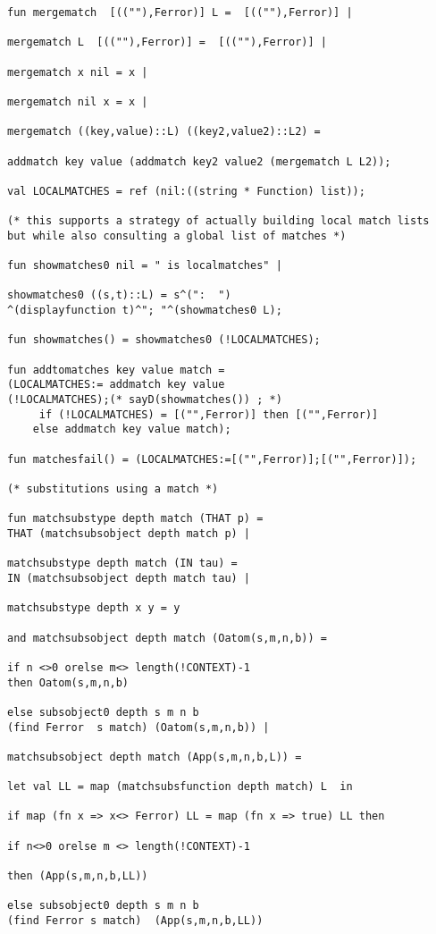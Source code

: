 \documentclass[12pt]{article}
\begin{document}
\begin{verbatim}
fun mergematch  [((""),Ferror)] L =  [((""),Ferror)] |

mergematch L  [((""),Ferror)] =  [((""),Ferror)] |

mergematch x nil = x |

mergematch nil x = x |

mergematch ((key,value)::L) ((key2,value2)::L2) =

addmatch key value (addmatch key2 value2 (mergematch L L2));

val LOCALMATCHES = ref (nil:((string * Function) list));

(* this supports a strategy of actually building local match lists
but while also consulting a global list of matches *)

fun showmatches0 nil = " is localmatches" |

showmatches0 ((s,t)::L) = s^(":  ")
^(displayfunction t)^"; "^(showmatches0 L);

fun showmatches() = showmatches0 (!LOCALMATCHES);

fun addtomatches key value match = 
(LOCALMATCHES:= addmatch key value 
(!LOCALMATCHES);(* sayD(showmatches()) ; *)
     if (!LOCALMATCHES) = [("",Ferror)] then [("",Ferror)]
    else addmatch key value match);

fun matchesfail() = (LOCALMATCHES:=[("",Ferror)];[("",Ferror)]);

(* substitutions using a match *)

fun matchsubstype depth match (THAT p) = 
THAT (matchsubsobject depth match p) |

matchsubstype depth match (IN tau) = 
IN (matchsubsobject depth match tau) |

matchsubstype depth x y = y

and matchsubsobject depth match (Oatom(s,m,n,b)) =

if n <>0 orelse m<> length(!CONTEXT)-1 
then Oatom(s,m,n,b)

else subsobject0 depth s m n b 
(find Ferror  s match) (Oatom(s,m,n,b)) |

matchsubsobject depth match (App(s,m,n,b,L)) =

let val LL = map (matchsubsfunction depth match) L  in

if map (fn x => x<> Ferror) LL = map (fn x => true) LL then

if n<>0 orelse m <> length(!CONTEXT)-1 

then (App(s,m,n,b,LL)) 

else subsobject0 depth s m n b 
(find Ferror s match)  (App(s,m,n,b,LL)) 


\end{verbatim}
\end{document}
